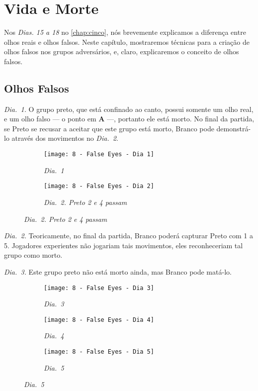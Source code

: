 \chapter{Vida e Morte}

Nos \emph{Dias. 15 a 18} no \autoref{chap:cinco}, nós brevemente explicamos a diferença entre olhos reais e olhos falsos. Neste capítulo, mostraremos técnicas para a criação de olhos falsos nos grupos adversários, e, claro, explicaremos o conceito de olhos falsos.

\section{Olhos Falsos}

\emph{Dia.\@~1.} O grupo preto, que está confinado ao canto, possui somente um olho real, e um olho falso --- o ponto em \textbf{A} ---, portanto ele está morto. No final da partida, se Preto se recusar a aceitar que este grupo está morto, Branco pode demonstrá-lo através dos movimentos no \emph{Dia.\@~2}.

\begin{figure}[h!]
    \centering
    \begin{subfigure}[t]{.31\textwidth}
        \texttt{[image: 8 - False Eyes - Dia 1]}
        \captionsetup{justification=centering}
        \caption*{\emph{Dia.\@~1}}
    \end{subfigure}
    \hspace{1cm}
    \begin{subfigure}[t]{.31\textwidth}
        \texttt{[image: 8 - False Eyes - Dia 2]}
        \caption*{\emph{Dia.\@~2. Preto 2 e 4 passam}}
    \end{subfigure}
\end{figure}

\emph{Dia.\@~2.} Teoricamente, no final da partida, Branco poderá capturar Preto com 1 a 5. Jogadores experientes não jogariam tais movimentos, eles reconheceriam tal grupo como morto.

\pagebreak

\emph{Dia.\@~3.} Este grupo preto não está morto ainda, mas Branco pode matá-lo.

\begin{figure}[h!]
    \centering
    \begin{subfigure}[t]{.31\textwidth}
        \texttt{[image: 8 - False Eyes - Dia 3]}
        \captionsetup{justification=centering}
        \caption*{\emph{Dia.\@~3}}
    \end{subfigure}
    \hfill
    \begin{subfigure}[t]{.31\textwidth}
        \texttt{[image: 8 - False Eyes - Dia 4]}
        \captionsetup{justification=centering}
        \caption*{\emph{Dia.\@~4}}
    \end{subfigure}
    \hfill
    \begin{subfigure}[t]{.31\textwidth}
        \texttt{[image: 8 - False Eyes - Dia 5]}
        \captionsetup{justification=centering}
        \caption*{\emph{Dia.\@~5}}
    \end{subfigure}
\end{figure}

